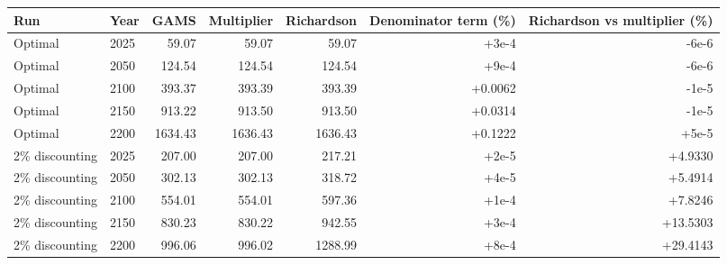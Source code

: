 \begin{tabular}{llrrrrr}
\toprule
Run & Year & GAMS & Multiplier & Richardson & Denominator term (\%) & Richardson vs multiplier (\%) \\
\midrule
Optimal & 2025 & 59.07 & 59.07 & 59.07 & +3e-4 & -6e-6 \\
Optimal & 2050 & 124.54 & 124.54 & 124.54 & +9e-4 & -6e-6 \\
Optimal & 2100 & 393.37 & 393.39 & 393.39 & +0.0062 & -1e-5 \\
Optimal & 2150 & 913.22 & 913.50 & 913.50 & +0.0314 & -1e-5 \\
Optimal & 2200 & 1634.43 & 1636.43 & 1636.43 & +0.1222 & +5e-5 \\
\midrule
2\% discounting & 2025 & 207.00 & 207.00 & 217.21 & +2e-5 & +4.9330 \\
2\% discounting & 2050 & 302.13 & 302.13 & 318.72 & +4e-5 & +5.4914 \\
2\% discounting & 2100 & 554.01 & 554.01 & 597.36 & +1e-4 & +7.8246 \\
2\% discounting & 2150 & 830.23 & 830.22 & 942.55 & +3e-4 & +13.5303 \\
2\% discounting & 2200 & 996.06 & 996.02 & 1288.99 & +8e-4 & +29.4143 \\
\bottomrule
\end{tabular}
